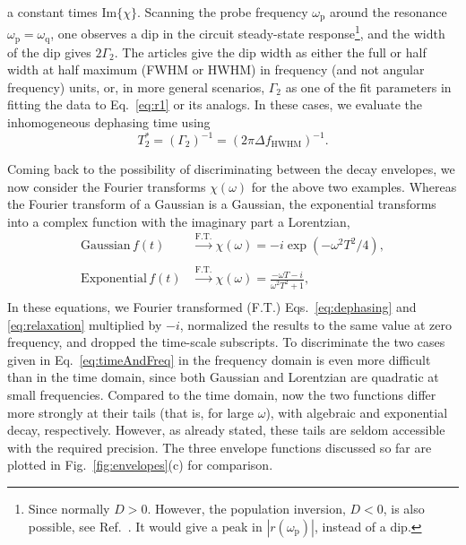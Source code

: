 \documentclass[aps, prx, showpacs, twocolumn, superscriptaddress, notitlepage, longbibliography, floatfix, nofootinbib]{revtex4-2}
\begin{document}
a constant times $\mathrm{Im}\{\chi\}$. 
Scanning the probe frequency $\omega_\mathrm{p}$ around the resonance $\omega_\mathrm{p}=\omega_\mathrm{q}$, one observes a dip in the circuit steady-state response\footnote{Since normally $D>0$. However, the population inversion, $D<0$, is also possible, see Ref.~\cite{hauss_single-qubit_2008}. It would give a peak in $|r(\omega_\mathrm{p})|$, instead of a dip.}, and the width of the dip gives $2\Gamma_2$. The articles give the dip width as either the full or half width at half maximum (FWHM or HWHM) in frequency (and not angular frequency) units, or, in more general scenarios, $\Gamma_2$ as one of the fit parameters in fitting the data to Eq.~\eqref{eq:r1} or its analogs. In these cases, we evaluate the inhomogeneous dephasing time using
\begin{equation}
T_2^* = (\Gamma_2)^{-1}= \left( 2 \pi \Delta\! f_\mathrm{HWHM} \right)^{-1}.
\label{eq:HWHM}
\end{equation}



Coming back to the possibility of discriminating between the decay envelopes, we now consider the Fourier transforms $\chi(\omega)$ for the above two examples. Whereas the Fourier transform of a Gaussian is a Gaussian, the exponential transforms into a complex function with the imaginary part a Lorentzian,
\begin{subequations}
\begin{align}
\textrm{Gaussian}\,f(t) &\overset{\mathrm{F.T.}}{\to}  \chi(\omega) = -i \exp( - \omega^2 T^2/4),\\
\nonumber\\
\textrm{Exponential}\,f(t) &\overset{\mathrm{F.T.}}{\to}   \chi(\omega) = \frac{- \omega T-i}{\omega^2 T^2 + 1},\\
\nonumber
\end{align}
\label{eq:timeAndFreq}
\end{subequations}
In  these equations, we Fourier transformed (F.T.) Eqs.~\eqref{eq:dephasing} and \eqref{eq:relaxation} multiplied by $-i$, normalized the results to the same value at zero frequency, and dropped the time-scale subscripts. To discriminate the two cases given in Eq.~\eqref{eq:timeAndFreq} in the frequency domain is even more difficult than in the time domain, since both Gaussian and Lorentzian are quadratic at small frequencies. Compared to the time domain, now the two functions differ more strongly at their tails (that is, for large $\omega$), with algebraic and exponential decay, respectively. However, as already stated, these tails are seldom accessible with the required precision. The three envelope functions discussed so far are plotted in Fig.~\ref{fig:envelopes}(c) for comparison.
\end{document}
